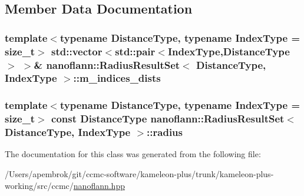 \subsection{Member Data Documentation}
\hypertarget{classnanoflann_1_1_radius_result_set_a88e8929d22445f82691a4d87969d4b99}{
\subsubsection[{m\-\_\-indices\-\_\-dists}]{\setlength{\rightskip}{0pt plus 5cm}template$<$typename Distance\-Type, typename Index\-Type = size\-\_\-t$>$ std\-::vector$<$std\-::pair$<$Index\-Type,Distance\-Type$>$ $>$\& {\bf nanoflann\-::\-Radius\-Result\-Set}$<$ Distance\-Type, Index\-Type $>$\-::m\-\_\-indices\-\_\-dists}}\label{classnanoflann_1_1_radius_result_set_a88e8929d22445f82691a4d87969d4b99}
\hypertarget{classnanoflann_1_1_radius_result_set_a427684c7ff35ce0bf50075a5cc062d42}{
\subsubsection[{radius}]{\setlength{\rightskip}{0pt plus 5cm}template$<$typename Distance\-Type, typename Index\-Type = size\-\_\-t$>$ const Distance\-Type {\bf nanoflann\-::\-Radius\-Result\-Set}$<$ Distance\-Type, Index\-Type $>$\-::radius}}\label{classnanoflann_1_1_radius_result_set_a427684c7ff35ce0bf50075a5cc062d42}


The documentation for this class was generated from the following file\-:\begin{DoxyCompactItemize}
\item 
/\-Users/apembrok/git/ccmc-\/software/kameleon-\/plus/trunk/kameleon-\/plus-\/working/src/ccmc/\hyperlink{nanoflann_8hpp}{nanoflann.\-hpp}\end{DoxyCompactItemize}
